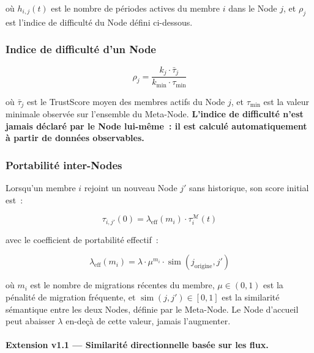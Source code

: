 \documentclass[12pt,a4paper]{article}
\theoremstyle{definition}
\theoremstyle{plain}
\theoremstyle{remark}
\newcommand{\trustscore}{\tau}
\newcommand{\1}{\mathbf{1}}
\begin{document}
où $h_{i,j}(t)$ est le nombre de périodes actives du membre $i$ dans le Node
$j$, et $\rho_j$ est l'indice de difficulté du Node défini ci-dessous.

\subsubsection{Indice de difficulté d'un Node}

\begin{equation}
\rho_j = \frac{k_j \cdot \bar{\trustscore}_j}{k_{\min} \cdot \trustscore_{\min}}
\label{eq:difficulty}
\end{equation}

où $\bar{\trustscore}_j$ est le TrustScore moyen des membres actifs du Node
$j$, et $\trustscore_{\min}$ est la valeur minimale observée sur l'ensemble du
Meta-Node. \textbf{L'indice de difficulté n'est jamais déclaré par le Node
lui-même~: il est calculé automatiquement à partir de données observables.}

\subsubsection{Portabilité inter-Nodes}

Lorsqu'un membre $i$ rejoint un nouveau Node $j'$ sans historique, son score
initial est~:

\begin{equation}
\trustscore_{i,j'}(0) = \lambda_{\text{eff}}(m_i) \cdot \trustscore_i^{\mathcal{M}}(t)
\label{eq:portability}
\end{equation}

avec le coefficient de portabilité effectif~:

\begin{equation}
\lambda_{\text{eff}}(m_i) = \lambda \cdot \mu^{m_i} \cdot \operatorname{sim}(j_{\text{origine}}, j')
\label{eq:lambda_eff}
\end{equation}

où $m_i$ est le nombre de migrations récentes du membre, $\mu \in (0,1)$ est
la pénalité de migration fréquente, et $\operatorname{sim}(j, j') \in [0,1]$
est la similarité sémantique entre les deux Nodes, définie par le Meta-Node.
Le Node d'accueil peut abaisser $\lambda$ en-deçà de cette valeur, jamais
l'augmenter.

\paragraph{Extension v1.1 --- Similarité directionnelle basée sur les flux.}
\end{document}
